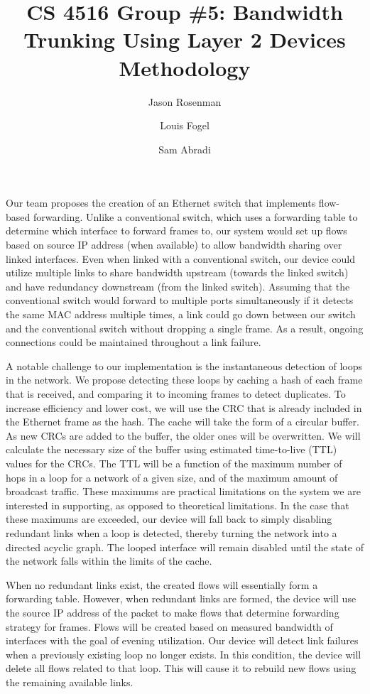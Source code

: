 \documentclass{article}
\title{CS 4516 Group \#5: Bandwidth Trunking Using Layer 2 Devices\\Methodology}
\author{Jason Rosenman \and Louis Fogel \and Sam Abradi}
\date{}
\begin{document}
\maketitle
	Our team proposes the creation of an Ethernet switch that implements flow-based forwarding.
	Unlike a conventional switch, which uses a forwarding table to determine which interface to forward frames to, our system would set up flows based on source IP address (when available) to allow bandwidth sharing over linked interfaces.
	Even when linked with a conventional switch, our device could utilize multiple links to share bandwidth upstream (towards the linked switch) and have redundancy downstream (from the linked switch).
	Assuming that the conventional switch would forward to multiple ports simultaneously if it detects the same MAC address multiple times, a link could go down between our switch and the conventional switch without dropping a single frame.
	As a result, ongoing connections could be maintained throughout a link failure.

	A notable challenge to our implementation is the instantaneous detection of loops in the network.
	We propose detecting these loops by caching a hash of each frame that is received, and comparing it to incoming frames to detect duplicates.
	To increase efficiency and lower cost, we will use the CRC that is already included in the Ethernet frame as the hash.
	The cache will take the form of a circular buffer.
	As new CRCs are added to the buffer, the older ones will be overwritten.
	We will calculate the necessary size of the buffer using estimated time-to-live (TTL) values for the CRCs.
	The TTL will be a function of the maximum number of hops in a loop for a network of a given size, and of the maximum amount of broadcast traffic.
	These maximums are practical limitations on the system we are interested in supporting, as opposed to theoretical limitations.
	In the case that these maximums are exceeded, our device will fall back to simply disabling redundant links when a loop is detected, thereby turning the network into a directed acyclic graph.
	The looped interface will remain disabled until the state of the network falls within the limits of the cache.
	
	When no redundant links exist, the created flows will essentially form a forwarding table.
	However, when redundant links are formed, the device will use the source IP address of the packet to make flows that determine forwarding strategy for frames.
	Flows will be created based on measured bandwidth of interfaces with the goal of evening utilization.
	Our device will detect link failures when a previously existing loop no longer exists.
	In this condition, the device will delete all flows related to that loop.
	This will cause it to rebuild new flows using the remaining available links.
\end{document}
